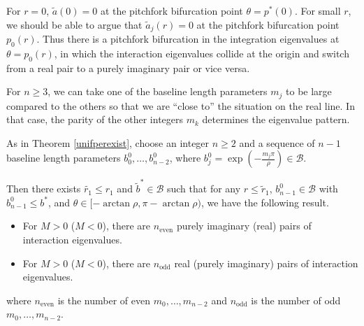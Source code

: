 \documentclass[thesis.tex]{subfiles}
\begin{document}
For $r = 0$, $\tilde{a}(0) = 0$ at the pitchfork bifurcation point $\theta = p^*(0)$. For small $r$, we should be able to argue that $\tilde{a}_j(r) = 0$ at the pitchfork bifurcation point $p_0(r)$. Thus there is a pitchfork bifurcation in the integration eigenvalues at $\theta = p_0(r)$, in which the interaction eigenvalues collide at the origin and switch from a real pair to a purely imaginary pair or vice versa. 

For $n \geq 3$, we can take one of the baseline length parameters $m_j$ to be large compared to the others so that we are ``close to'' the situation on the real line. In that case, the parity of the other integers $m_k$ determines the eigenvalue pattern.

\begin{lemma}\label{inteigsparity}
As in Theorem \ref{unifperexist}, choose an integer $n \geq 2$ and a sequence of $n-1$ baseline length parameters $b_0^0, \dots, b_{n-2}^0$, where $b_j^0 = \exp\left(-\frac{m_j \pi}{\rho}\right) \in \mathcal{B}$. 

Then there exists $\tilde{r_1} \leq r_1$ and $\tilde{b}^* \in \mathcal{B}$ such that for any $r \leq \tilde{r}_1$, $b_{n-1}^0 \in \mathcal{B}$ with $b_{n-1}^0 \leq b^*$, and $\theta \in [-\arctan \rho, \pi - \arctan \rho)$, we have the following result.
\begin{itemize}
\item For $M > 0$ ($M < 0$), there are $n_{\text{even}}$ purely imaginary (real) pairs of interaction eigenvalues.
\item For $M > 0$ ($M < 0$), there are $n_{\text{odd}}$ real (purely imaginary) pairs of interaction eigenvalues.
\end{itemize}
where $n_{\text{even}}$ is the number of even $m_0, \dots, m_{n-2}$ and $n_{\text{odd}}$ is the number of odd $m_0, \dots, m_{n-2}$.


\end{lemma}
\end{document}
